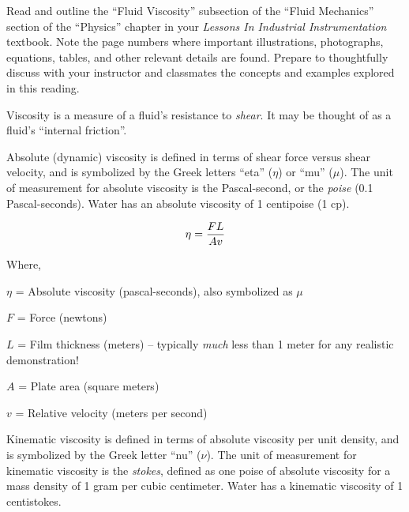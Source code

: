 

Read and outline the ``Fluid Viscosity'' subsection of the ``Fluid Mechanics'' section of the ``Physics'' chapter in your {\it Lessons In Industrial Instrumentation} textbook.  Note the page numbers where important illustrations, photographs, equations, tables, and other relevant details are found.  Prepare to thoughtfully discuss with your instructor and classmates the concepts and examples explored in this reading.














Viscosity is a measure of a fluid's resistance to {\it shear}.  It may be thought of as a fluid's ``internal friction''.

\vskip 10pt

Absolute (dynamic) viscosity is defined in terms of shear force versus shear velocity, and is symbolized by the Greek letters ``eta'' ($\eta$) or ``mu'' ($\mu$).  The unit of measurement for absolute viscosity is the Pascal-second, or the {\it poise} (0.1 Pascal-seconds).  Water has an absolute viscosity of 1 centipoise (1 cp).

$$\eta = {FL \over Av}$$

\noindent
Where,

$\eta$ = Absolute viscosity (pascal-seconds), also symbolized as $\mu$ 

$F$ = Force (newtons)

$L$ = Film thickness (meters) -- typically {\it much} less than 1 meter for any realistic demonstration!

$A$ = Plate area (square meters)

$v$ = Relative velocity (meters per second)

\vskip 20pt

Kinematic viscosity is defined in terms of absolute viscosity per unit density, and is symbolized by the Greek letter ``nu'' ($\nu$).  The unit of measurement for kinematic viscosity is the {\it stokes}, defined as one poise of absolute viscosity for a mass density of 1 gram per cubic centimeter.  Water has a kinematic viscosity of 1 centistokes.

